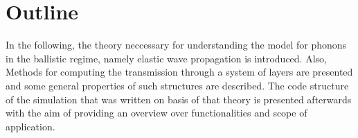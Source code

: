 
\section{Outline}
In the following, the theory neccessary for understanding the model for phonons
in the ballistic regime, namely elastic wave propagation is introduced. Also,
Methods for computing the transmission through a system of layers are presented
and some general properties of such structures are described.
The code structure of the simulation that was written on basis of
that theory is presented afterwards with the aim of providing an overview over 
functionalities and scope of application.